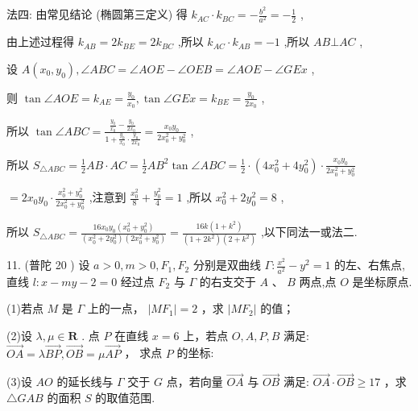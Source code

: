 \documentclass[10pt]{article}
\begin{document}
法四: 由常见结论 (椭圆第三定义) 得 \({k}_{AC} \cdot  {k}_{BC} =  - \frac{{b}^{2}}{{a}^{2}} =  - \frac{1}{2}\) ,

由上述过程得 \({k}_{AB} = 2{k}_{BE} = 2{k}_{BC}\) ,所以 \({k}_{AC} \cdot  {k}_{AB} =  - 1\) ,所以 \({AB} \bot  {AC}\) ,

设 \(A\left( {{x}_{0},{y}_{0}}\right) ,\angle {ABC} = \angle {AOE} - \angle {OEB} = \angle {AOE} - \angle {GEx}\) ,

则 \(\tan \angle {AOE} = {k}_{AE} = \frac{{y}_{0}}{{x}_{0}},\tan \angle {GEx} = {k}_{BE} = \frac{{y}_{0}}{2{x}_{0}}\) ,

所以 \(\tan \angle {ABC} = \frac{\frac{{y}_{0}}{{x}_{0}} - \frac{{y}_{0}}{2{x}_{0}}}{1 + \frac{{y}_{0}}{{x}_{0}} \cdot  \frac{{y}_{0}}{2{x}_{0}}} = \frac{{x}_{0}{y}_{0}}{2{x}_{0}^{2} + {y}_{0}^{2}}\) ,

所以 \({S}_{\bigtriangleup {ABC}} = \frac{1}{2}{AB} \cdot  {AC} = \frac{1}{2}A{B}^{2}\tan \angle {ABC} = \frac{1}{2} \cdot  \left( {4{x}_{0}^{2} + 4{y}_{0}^{2}}\right)  \cdot  \frac{{x}_{0}{y}_{0}}{2{x}_{0}^{2} + {y}_{0}^{2}}\)

\(= 2{x}_{0}{y}_{0} \cdot  \frac{{x}_{0}^{2} + {y}_{0}^{2}}{2{x}_{0}^{2} + {y}_{0}^{2}}\) ,注意到 \(\frac{{x}_{0}^{2}}{8} + \frac{{y}_{0}^{2}}{4} = 1\) ,所以 \({x}_{0}^{2} + 2{y}_{0}^{2} = 8\) ,

所以 \({S}_{\bigtriangleup {ABC}} = \frac{{16}{x}_{0}{y}_{0}\left( {{x}_{0}^{2} + {y}_{0}^{2}}\right) }{\left( {{x}_{0}^{2} + 2{y}_{0}^{2}}\right) \left( {2{x}_{0}^{2} + {y}_{0}^{2}}\right) } = \frac{{16k}\left( {1 + {k}^{2}}\right) }{\left( {1 + 2{k}^{2}}\right) \left( {2 + {k}^{2}}\right) }\) ,以下同法一或法二.

11. (普陀 20 ) 设 \(a > 0,m > 0,{F}_{1},{F}_{2}\) 分别是双曲线 \(\Gamma  : \frac{{x}^{2}}{{a}^{2}} - {y}^{2} = 1\) 的左、右焦点,直线 \(l : x - {my} - 2 = 0\) 经过点 \({F}_{2}\) 与 \(\Gamma\) 的右支交于 \(A\text{ 、 }B\) 两点,点 \(O\) 是坐标原点.

(1)若点 \(M\) 是 \(\Gamma\) 上的一点， \(\left| {M{F}_{1}}\right|  = 2\) ，求 \(\left| {M{F}_{2}}\right|\) 的值；

(2)设 \(\lambda ,\mu  \in  \mathbf{R}\) . 点 \(P\) 在直线 \(x = 6\) 上，若点 \(O,A,P,B\) 满足: \(\overrightarrow{OA} = \lambda \overrightarrow{BP},\overrightarrow{OB} = \mu \overrightarrow{AP}\) ， 求点 \(P\) 的坐标:

(3)设 \({AO}\) 的延长线与 \(\Gamma\) 交于 \(G\) 点，若向量 \(\overrightarrow{OA}\) 与 \(\overrightarrow{OB}\) 满足: \(\overrightarrow{OA} \cdot  \overrightarrow{OB} \geq  {17}\) ，求 \(\bigtriangleup  {GAB}\) 的面积 \(S\) 的取值范围.
\end{document}
